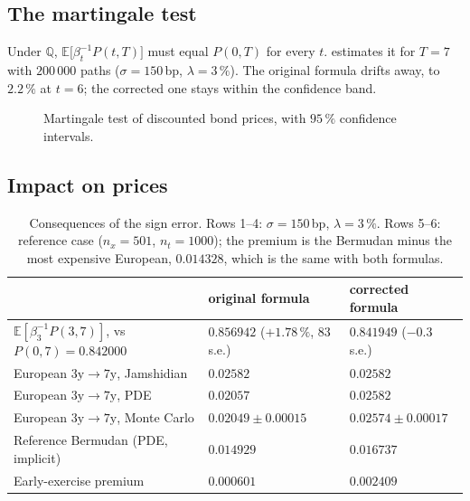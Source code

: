 \documentclass[11pt,a4paper]{article}
\theoremstyle{definition}
\theoremstyle{remark}
\newcommand{\E}{\mathbb{E}}
\newcommand{\Q}{\mathbb{Q}}
\begin{document}
\subsection{The martingale test}
Under $\Q$, $\E\big[\beta_t^{-1}P(t,T)\big]$ must equal $P(0,T)$ for every $t$.  estimates it for $T=7$ with
$200\,000$ paths ($\sigma=150$\,bp, $\lambda=3\,\%$). The original formula drifts away, to $2.2\,\%$ at $t=6$; the corrected
one stays within the confidence band.

\begin{figure}[ht]\centering
{}
\caption{Martingale test of discounted bond prices, with $95\,\%$ confidence intervals.}\label{fig:mart}
\end{figure}

\subsection{Impact on prices}
\begin{table}[ht]\centering\small
\begin{tabular}{@{}lll@{}}\toprule
 & original formula & corrected formula\\\midrule
$\E[\beta_3^{-1}P(3,7)]$, vs $P(0,7)=0.842000$ & $0.856942$ ($+1.78\,\%$, $83$ s.e.) & $0.841949$ ($-0.3$ s.e.)\\
European $3\mathrm{y}\to7\mathrm{y}$, Jamshidian & $0.02582$ & $0.02582$\\
European $3\mathrm{y}\to7\mathrm{y}$, PDE & $0.02057$ & $0.02582$\\
European $3\mathrm{y}\to7\mathrm{y}$, Monte Carlo & $0.02049\pm0.00015$ & $0.02574\pm0.00017$\\
Reference Bermudan (PDE, implicit) & $0.014929$ & $0.016737$\\
Early-exercise premium & $0.000601$ & $0.002409$\\\bottomrule
\end{tabular}
\caption{Consequences of the sign error. Rows 1--4: $\sigma=150$\,bp, $\lambda=3\,\%$. Rows 5--6: reference case
($n_x=501$, $n_t=1000$); the premium is the Bermudan minus the most expensive European, $0.014328$, which is the same with both
formulas.}\label{tab:impact}
\end{table}
\end{document}
